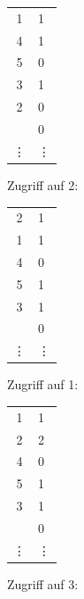 \begin{enumerate}[a)]
\begin{solution}
\begin{minipage}{0.28\textwidth}
        \begin{tabular}{ | c | l}
        	\cline{1-1}
        	1      & 1      \\ \cline{1-1}
        	4      & 1      \\ \cline{1-1}
        	5      & 0      \\ \cline{1-1}
        	3      & 1      \\ \cline{1-1}
        	2      & 0      \\ \cline{1-1}
        	       & 0      \\ \cline{1-1}
        	\vdots & \vdots \\ \cline{1-1}
        \end{tabular}
    \end{minipage}
    \begin{minipage}{0.22\textwidth}
        \center
        Zugriff auf 2:

        \begin{tabular}{ | c | l}
        	\cline{1-1}
        	2      & 1      \\ \cline{1-1}
        	1      & 1      \\ \cline{1-1}
        	4      & 0      \\ \cline{1-1}
        	5      & 1      \\ \cline{1-1}
        	3      & 1      \\ \cline{1-1}
        	       & 0      \\ \cline{1-1}
        	\vdots & \vdots \\ \cline{1-1}
        \end{tabular}
    \end{minipage}
    \begin{minipage}{0.22\textwidth}
        \center
        Zugriff auf 1:

        \begin{tabular}{ | c | l}
        	\cline{1-1}
        	1      & 1      \\ \cline{1-1}
        	2      & 2      \\ \cline{1-1}
        	4      & 0      \\ \cline{1-1}
        	5      & 1      \\ \cline{1-1}
        	3      & 1      \\ \cline{1-1}
        	       & 0      \\ \cline{1-1}
        	\vdots & \vdots \\ \cline{1-1}
        \end{tabular}
    \end{minipage}
    \begin{minipage}{0.22\textwidth}
        \center
        Zugriff auf 3:


\end{minipage}
\end{solution}
\end{enumerate}
